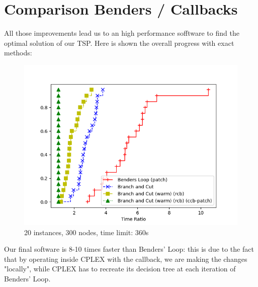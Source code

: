 \section{Comparison Benders / Callbacks}
All those improvements lead us to an high performance sofftware to find the optimal solution of our TSP. Here is shown the overall progress with exact methods:

\FloatBarrier
\begin{figure}[h]
    \centering
    \includegraphics*[width=.6\textwidth]{../plots/perfprof_exact_times_result.png}
    \caption*{20 instances, 300 nodes, time limit: 360s}
\end{figure}
\FloatBarrier

Our final software is 8-10 times faster than Benders' Loop: this is due to the fact that by operating inside CPLEX with the callback, we are making the changes "locally", while CPLEX has to recreate its decision tree at each iteration of Benders' Loop.